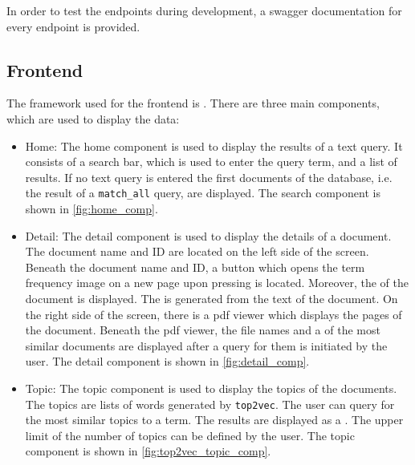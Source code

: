 In order to test the endpoints during development, a swagger documentation for every endpoint is provided.





\subsection{Frontend}\label{subsec:frontend}

The framework used for the frontend is \angular{}.
There are three main components, which are used to display the data:

\begin{itemize}
    \item \label{pt:home}Home: 
        The home component is used to display the results of a text query.
        It consists of a search bar, which is used to enter the query term, and a list of results.
        If no text query is entered the first documents of the database, i.e. the result of a \texttt{match\_all} query, are displayed.
        The search component is shown in \autoref{fig:home_comp}.

    \item \label{pt:detail}Detail: 
        The detail component is used to display the details of a document.
        The document name and ID are located on the left side of the screen.
        Beneath the document name and ID, a button which opens the term frequency image on a new page upon pressing is located. 
        Moreover, the \wordcloud{} of the document is displayed.
        The \wordcloud{} is generated from the text of the document.
        On the right side of the screen, there is a \ac{pdf} viewer which displays the pages of the document.
        Beneath the \ac{pdf} viewer, the file names and a \wordcloud{} of the most similar documents are displayed after a query for them is initiated by the user.
        The detail component is shown in \autoref{fig:detail_comp}.

    \item \label{pt:topic}Topic: 
        The topic component is used to display the topics of the documents.
        The topics are lists of words generated by \texttt{top2vec}.
        The user can query for the most similar topics to a term.
        The results are displayed as a \wordcloud{}.
        The upper limit of the number of topics can be defined by the user.
        The topic component is shown in \autoref{fig:top2vec_topic_comp}.
\end{itemize}


